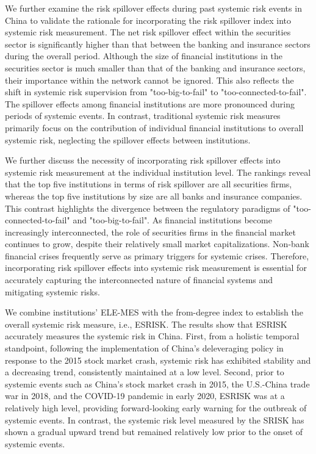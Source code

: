 \documentclass[12pt,a4paper]{article}
\begin{document}
    We further examine the risk spillover effects during past systemic risk events in China to validate the rationale for incorporating the risk spillover index into systemic risk measurement. The net risk spillover effect within the securities sector is significantly higher than that between the banking and insurance sectors during the overall period. Although the size of financial institutions in the securities sector is much smaller than that of the banking and insurance sectors, their importance within the network cannot be ignored. This also reflects the shift in systemic risk supervision from "too-big-to-fail" to "too-connected-to-fail". The spillover effects among financial institutions are more pronounced during periods of systemic events. In contrast, traditional systemic risk measures primarily focus on the contribution of individual financial institutions to overall systemic risk, neglecting the spillover effects between institutions.

    We further discuss the necessity of incorporating risk spillover effects into systemic risk measurement at the individual institution level. The rankings reveal that the top five institutions in terms of risk spillover are all securities firms, whereas the top five institutions by size are all banks and insurance companies. This contrast highlights the divergence between the regulatory paradigms of "too-connected-to-fail" and "too-big-to-fail". As financial institutions become increasingly interconnected, the role of securities firms in the financial market continues to grow, despite their relatively small market capitalizations. Non-bank financial crises frequently serve as primary triggers for systemic crises. Therefore, incorporating risk spillover effects into systemic risk measurement is essential for accurately capturing the interconnected nature of financial systems and mitigating systemic risks.

    We combine institutions' ELE-MES with the from-degree index to establish the overall systemic risk measure, i.e., ESRISK. The results show that ESRISK accurately measures the systemic risk in China. First, from a holistic temporal standpoint, following the implementation of China's deleveraging policy in response to the 2015 stock market crash, systemic risk has exhibited stability and a decreasing trend, consistently maintained at a low level. Second, prior to systemic events such as China's stock market crash in 2015, the U.S.-China trade war in 2018, and the COVID-19 pandemic in early 2020, ESRISK was at a relatively high level, providing forward-looking early warning for the outbreak of systemic events. In contrast, the systemic risk level measured by the SRISK has shown a gradual upward trend but remained relatively low prior to the onset of systemic events.
\end{document}
